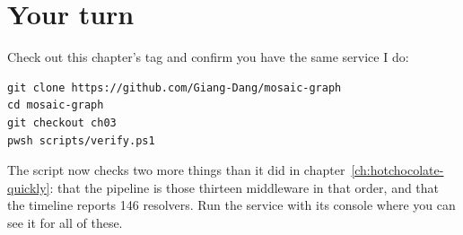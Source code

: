 \section*{Your turn}

Check out this chapter's tag and confirm you have the same service I do:

\begin{verbatim}
git clone https://github.com/Giang-Dang/mosaic-graph
cd mosaic-graph
git checkout ch03
pwsh scripts/verify.ps1
\end{verbatim}

The script now checks two more things than it did in
chapter~\ref{ch:hotchocolate-quickly}: that the pipeline is those thirteen
middleware in that order, and that the timeline reports 146 resolvers. Run the
service with its console where you can see it for all of these.

